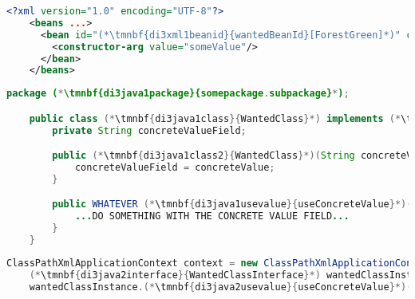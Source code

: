 \begin{lstlisting}[language=XML, title={Configuration XML}]
    <?xml version="1.0" encoding="UTF-8"?>
    <beans ...>
      <bean id="(*\tmnbf{di3xml1beanid}{wantedBeanId}[ForestGreen]*)" class="(*\tmnbf{di3xml1package}{somepackage.subpackage}[ForestGreen]*).(*\tmnbf{di3xml1class}{WantedClass}[ForestGreen]*)">
        <constructor-arg value="someValue"/>
      </bean>
    </beans>
\end{lstlisting}
\begin{lstlisting}[language=Java, title={Wanted class with the constructor}]
    package (*\tmnbf{di3java1package}{somepackage.subpackage}*);

    public class (*\tmnbf{di3java1class}{WantedClass}*) implements (*\tmnbf{di3java1interface}{WantedClassInterface}*) {
        private String concreteValueField;

        public (*\tmnbf{di3java1class2}{WantedClass}*)(String concreteValue) {
            concreteValueField = concreteValue;
        }

        public WHATEVER (*\tmnbf{di3java1usevalue}{useConcreteValue}*)() {
            ...DO SOMETHING WITH THE CONCRETE VALUE FIELD...
        }
    }
\end{lstlisting}
\begin{lstlisting}[language=Java, title={Usage}]
    ClassPathXmlApplicationContext context = new ClassPathXmlApplicationContext("configurationFile.xml");
    (*\tmnbf{di3java2interface}{WantedClassInterface}*) wantedClassInstance = context.getBean("(*\tmnbf{di3java2beanid}{wantedBeanId}[ForestGreen]*)", (*\tmnbf{di3java2interface2}{WantedClassInterface}*).class);
    wantedClassInstance.(*\tmnbf{di3java2usevalue}{useConcreteValue}*)();
\end{lstlisting}
\newpage


